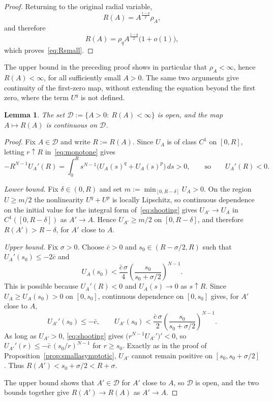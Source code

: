 \documentclass[11pt]{article}
\newcommand{\add}[1]{{\color{blue}#1}}
\newtheorem{lemma}[theorem]{Lemma}
\theoremstyle{definition}
\begin{document}
\begin{proof}
Returning to the original radial variable,
\[
R(A)
=
A^{\frac{1-q}{2}}\rho_A,
\]
and therefore
\[
R(A)
=
\rho_q A^{\frac{1-q}{2}}
\bigl(1+o(1)\bigr),
\]
which proves~\eqref{eq:Rsmall}.
\end{proof}

\add{The upper bound in the preceding proof shows in particular that
$\rho_A<\infty$, hence $R(A)<\infty$, for all sufficiently small
$A>0$. The same two arguments give continuity of the first-zero map,
without extending the equation beyond the first zero, where the term
$U^q$ is not defined.}

\begin{lemma}
\label{lem:R-continuous}
\add{The set $\mathcal D:=\{A>0:\ R(A)<\infty\}$ is open, and the map
$A\mapsto R(A)$ is continuous on $\mathcal D$.}
\end{lemma}

{\color{blue}
\begin{proof}
Fix $A\in\mathcal D$ and write $R:=R(A)$. Since $U_A$ is of class
$C^1$ on $[0,R]$, letting $r\uparrow R$ in~\eqref{eq:monotone} gives
\[
-R^{N-1}U_A'(R)
=
\int_0^R s^{N-1}\bigl(U_A(s)^q+U_A(s)^p\bigr)\,ds>0,
\qquad\text{so}\qquad U_A'(R)<0.
\]

\emph{Lower bound.} Fix $\delta\in(0,R)$ and set
$m:=\min_{[0,R-\delta]}U_A>0$. On the region $U\geq m/2$ the
nonlinearity $U^q+U^p$ is locally Lipschitz, so continuous dependence
on the initial value for the integral form of~\eqref{eq:shooting}
gives $U_{A'}\to U_A$ in $C^1([0,R-\delta])$ as $A'\to A$. Hence
$U_{A'}\geq m/2$ on $[0,R-\delta]$, and therefore
$R(A')>R-\delta$, for $A'$ close to $A$.

\emph{Upper bound.} Fix $\sigma>0$. Choose $\bar c>0$ and
$s_0\in(R-\sigma/2,R)$ such that $U_A'(s_0)\leq-2\bar c$ and
\[
U_A(s_0)
<
\frac{\bar c\,\sigma}{4}
\left(\frac{s_0}{s_0+\sigma/2}\right)^{N-1}.
\]
This is possible because $U_A'(R)<0$ and $U_A(s)\to0$ as $s\uparrow R$.
Since $U_A\geq U_A(s_0)>0$ on $[0,s_0]$, continuous dependence on
$[0,s_0]$ gives, for $A'$ close to $A$,
\[
U_{A'}'(s_0)\leq-\bar c,
\qquad
U_{A'}(s_0)
<
\frac{\bar c\,\sigma}{2}
\left(\frac{s_0}{s_0+\sigma/2}\right)^{N-1}.
\]
As long as $U_{A'}>0$, \eqref{eq:shooting} gives
$\bigl(r^{N-1}U_{A'}'\bigr)'<0$, so
$U_{A'}'(r)\leq-\bar c\,(s_0/r)^{N-1}$ for $r\geq s_0$. Exactly as in
the proof of Proposition~\ref{prop:smallasymptotic}, $U_{A'}$ cannot
remain positive on $[s_0,s_0+\sigma/2]$. Thus
$R(A')<s_0+\sigma/2<R+\sigma$.

The upper bound shows that $A'\in\mathcal D$ for $A'$ close to $A$, so
$\mathcal D$ is open, and the two bounds together give
$R(A')\to R(A)$ as $A'\to A$.
\end{proof}
}
\end{document}
